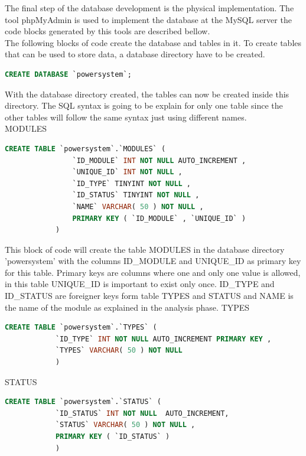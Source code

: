 \begin{itemize}
\end{itemize}

The final step of the database development is the physical implementation. The tool phpMyAdmin is used to implement the database at the MySQL server the code blocks generated by this tools are described bellow. 
\\
The following blocks of code create the database and tables in it.
To create tables that can be used to store data, a database directory have to be created.
		\begin{lstlisting}[language=sql, stepnumber=0, tabsize=1]
			CREATE DATABASE `powersystem`;
		\end{lstlisting}
		With the database directory created, the tables can now be created inside this directory.
The SQL syntax is going to be explain for only one table since the other tables will follow the same syntax just using different names.\\
		MODULES
		\begin{lstlisting}[language=sql, stepnumber=0, tabsize=1]
			CREATE TABLE `powersystem`.`MODULES` (
				`ID_MODULE` INT NOT NULL AUTO_INCREMENT ,
				`UNIQUE_ID` INT NOT NULL ,
				`ID_TYPE` TINYINT NOT NULL ,
				`ID_STATUS` TINYINT NOT NULL ,
				`NAME` VARCHAR( 50 ) NOT NULL ,
				PRIMARY KEY ( `ID_MODULE` , `UNIQUE_ID` )
			) 
		\end{lstlisting}
		This block of code will create the table MODULES in the database directory 'powersystem' with the columns ID\_MODULE and UNIQUE\_ID as primary key for this table. Primary keys are columns where one and only one value is allowed, in this table UNIQUE\_ID is important to exist only once. 
		ID\_TYPE and ID\_STATUS are foreigner keys form table TYPES and STATUS and NAME is the name of the module as explained in the analysis phase.
		TYPES
		\begin{lstlisting}[language=sql, stepnumber=0, tabsize=1]
			CREATE TABLE `powersystem`.`TYPES` (
			`ID_TYPE` INT NOT NULL AUTO_INCREMENT PRIMARY KEY ,
			`TYPES` VARCHAR( 50 ) NOT NULL
			)
		\end{lstlisting}
		STATUS
		\begin{lstlisting}[language=sql, stepnumber=0, tabsize=1]
			CREATE TABLE `powersystem`.`STATUS` (
			`ID_STATUS` INT NOT NULL  AUTO_INCREMENT,
			`STATUS` VARCHAR( 50 ) NOT NULL ,
			PRIMARY KEY ( `ID_STATUS` )
			)
		\end{lstlisting}	
